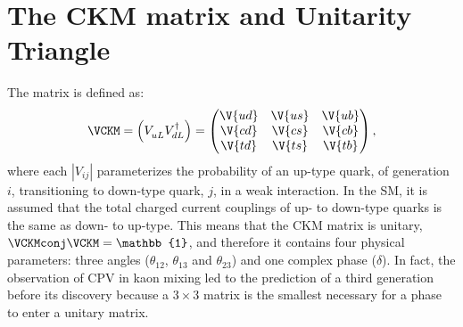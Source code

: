 \section{The CKM matrix and Unitarity Triangle}
\label{sec:ckm}

The \ckm matrix is defined as:
\begin{equation}
  \VCKM = \left(V_{uL}^{\phantom{\dagger}} V_{dL}^\dagger\right) =
  \begin{pmatrix}
    \V{ud} & \V{us} & \V{ub} \\
    \V{cd} & \V{cs} & \V{cb} \\
    \V{td} & \V{ts} & \V{tb} \\
  \end{pmatrix},
\end{equation}
where each $|V_{ij}|$ parameterizes the probability of an up-type quark, of generation $i$,
transitioning to down-type quark, $j$, in a weak interaction.
In the SM, it is assumed that the total charged current couplings of up- to down-type quarks is the
same as down- to up-type.
This means that the CKM matrix is unitary, $\VCKMconj\VCKM = \mathbb{1}$, and therefore it contains
four physical parameters: three angles ($\theta_{12}$, $\theta_{13}$ and $\theta_{23}$) and one
complex phase ($\delta$).
In fact, the observation of CPV in kaon mixing led to the prediction of a third generation before
its discovery because a $3\times3$ matrix is the smallest necessary for a phase to enter a unitary
matrix.



